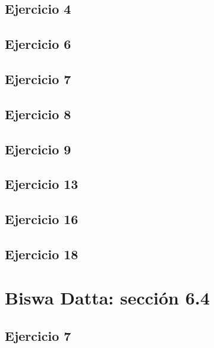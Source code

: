 \documentclass[12pt]{article}
\begin{document}
\subsection{Ejercicio 4}

\subsection{Ejercicio 6}

\subsection{Ejercicio 7}

\subsection{Ejercicio 8}

\subsection{Ejercicio 9}

\subsection{Ejercicio 13}

\subsection{Ejercicio 16}

\subsection{Ejercicio 18}

%
\section{Biswa Datta: sección 6.4}

\subsection{Ejercicio 7}
\end{document}
